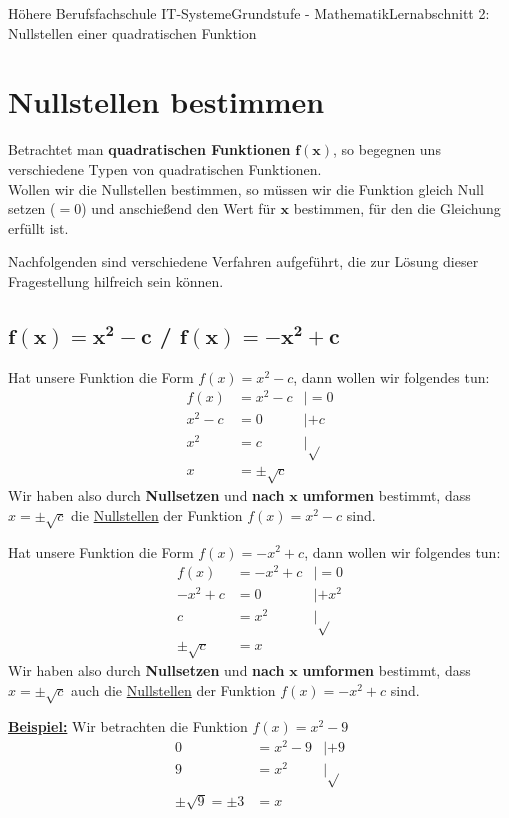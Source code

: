 \documentclass[11pt,twocolumn,oneside,openany,headings=optiontotoc,11pt,numbers=noenddot]{article}
\begin{document}
	\begin{worksheet}{Höhere Berufsfachschule IT-Systeme}{Grundstufe - Mathematik}{Lernabschnitt 2: Nullstellen einer quadratischen Funktion}
		\setcounter{section}{3}
		\section{Nullstellen bestimmen}
		Betrachtet  man \textbf{quadratischen Funktionen} \(\mathbf{f(x)}\), so begegnen uns verschiedene Typen von quadratischen Funktionen.\\
		Wollen wir die Nullstellen bestimmen, so müssen wir die Funktion gleich Null setzen (\(= 0\)) und anschießend den Wert für \(\mathbf{x}\) bestimmen, für den die Gleichung erfüllt ist.\\
		\par\noindent
		Nachfolgenden sind verschiedene Verfahren aufgeführt, die zur Lösung dieser Fragestellung hilfreich sein können.
		\subsection{\(\mathbf{f(x) = x^2 - c}\) / \(\mathbf{f(x) = -x^2 + c}\)}
		Hat unsere Funktion die Form \underline{\(f(x) = x^2 - c\)}, dann wollen wir folgendes tun:
		\begin{align*}
			f(x) & = x^2 - c & | = 0\\
			x^2 - c & = 0 & | +c\\
			x^2 & = c & | \sqrt{}\\
			x & = \pm\sqrt{c}
		\end{align*}
		Wir haben also durch \textbf{Nullsetzen} und \textbf{nach} \(\mathbf{x}\) \textbf{umformen} bestimmt, dass \colorbox{green!10}{\(x = \pm\sqrt{c}\)} die \underline{Nullstellen} der Funktion \(f(x) = x^2 - c\) sind.\\
		\par\noindent
		Hat unsere Funktion die Form \underline{\(f(x) = -x^2 + c\)}, dann wollen wir folgendes tun:
		\begin{align*}
			f(x) & = - x^2 + c & | = 0\\
			- x^2 + c & = 0 & | + x^2\\
			c & = x^2 & | \sqrt{}\\
			\pm\sqrt{c} & = x
		\end{align*}
		Wir haben also durch \textbf{Nullsetzen} und \textbf{nach} \(\mathbf{x}\) \textbf{umformen} bestimmt, dass \colorbox{green!10}{\(x = \pm\sqrt{c}\)} auch die \underline{Nullstellen} der Funktion \(f(x) = -x^2 + c\) sind.\\
		\par\noindent
		\textbf{\underline{Beispiel:}} Wir betrachten die Funktion \(f(x) = x^2 - 9\)
		\begin{align*}
			0 & = x^2 - 9 & |+9\\
			9 & = x^2 & |\sqrt{}\\
			\pm{}\sqrt{9} = \pm{}3 & = x
		\end{align*}

\end{worksheet}
\end{document}
